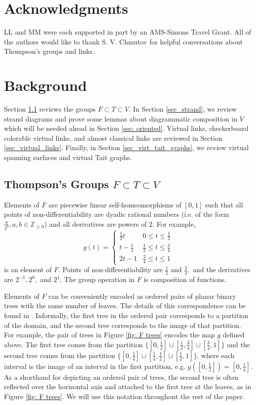 \documentclass[11pt, twoside]{amsart}
\numberwithin{equation}{section}
\theoremstyle{definition}
\numberwithin{equation}{section}
\begin{document}
\section*{Acknowledgments}
LL and MM were each supported in part by an AMS-Simons Travel Grant. All of the authors would like to thank S. V. Chmutov for helpful conversations about Thompson's groups and links. 

\section{Background}\label{sec: background}

Section \ref{sec_F_T_V} reviews the groups $F\subset T \subset V$. In Section \ref{sec_strand}, we review strand diagrams and prove some lemmas about diagrammatic composition in $V$ which will be needed ahead in Section \ref{sec: oriented}. Virtual links, checkerboard colorable virtual links, and almost classical links are reviewed in Section \ref{sec_virtual_links}. Finally, in Section \ref{sec_virt_tait_graphs}, we review virtual spanning surfaces and virtual Tait graphs.

\subsection{Thompson's Groups $F \subset T \subset V$} \label{sec_F_T_V}
Elements of $F$ are piecewise linear self-homeomorphisms of $[0,1]$ such that all points of non-differentiability are dyadic rational numbers (i.e. of the form $\frac{a}{2^b},a, b\in \mathbb{Z}_{\geq 0}$) and all derivatives are powers of $2$.  For example, \[g(t)=\begin{cases} \frac{1}{2}t & 0 \leq t \leq \frac{1}{2}\\ t-\frac{1}{4} & \frac{1}{2} \leq t \leq \frac{3}{4} \\ 2t-1 & \frac{3}{4} \leq t \leq 1\end{cases}\] is an element of $F$. Points of non-differentiability are $\frac{1}{2}$ and $\frac{3}{4},$ and the derivatives are $2^{-1}, 2^0,$ and $2^1$. The group operation in $F$ is composition of functions.

Elements of $F$ can be conveniently encoded as ordered pairs of planar binary trees with the same number of leaves. The details of this correspondence can be found in \cite[Section 2]{cfpnotes}. Informally, the first tree in the ordered pair corresponds to a partition of the domain, and the second tree corresponds to the image of that partition. For example, the pair of trees in Figure \ref{fig: F trees} encodes the map $g$ defined above. The first tree comes from the partition \(\{[0, \frac{1}{2}] \cup [\frac{1}{2}, \frac{3}{4}]\cup [\frac{3}{4},1]\}\) and the second tree comes from the partition \(\{[0,\frac{1}{4}]\cup [\frac{1}{4},\frac{1}{2}] \cup [\frac{1}{2},1]\}\), where each interval is the image of an interval in the first partition, e.g. $g([0, \frac{1}{2}])=[0,\frac{1}{4}].$ As a shorthand for depicting an ordered pair of trees, the second tree is often reflected over the horizontal axis and attached to the first tree at the leaves, as in Figure \ref{fig: F trees}. We will use this notation throughout the rest of the paper.  
\end{document}
